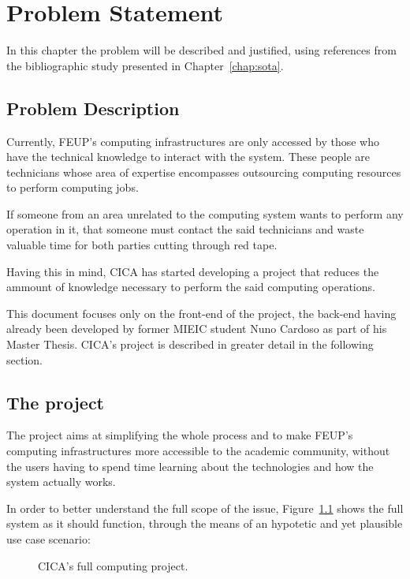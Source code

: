 \chapter{Problem Statement} \label{chap:chap3}

In this chapter the problem will be described and justified, using references from the bibliographic study presented in Chapter~\ref{chap:sota}.

\section{Problem Description}

Currently, FEUP's computing infrastructures are only accessed by those who have the technical knowledge to interact with the system. These people are technicians whose area of expertise encompasses outsourcing computing resources to perform computing jobs. 

If someone from an area unrelated to the computing system wants to perform any operation in it, that someone must contact the said technicians and waste valuable time for both parties cutting through red tape.

Having this in mind, CICA has started developing a project that reduces the ammount of knowledge necessary to perform the said computing operations.

This document focuses only on the front-end of the project, the back-end having already been developed by former MIEIC student Nuno Cardoso as part of his Master Thesis. CICA's project is described in greater detail in the following section.

\section{The project} \label{sec:project}


The project aims at simplifying the whole process and to make FEUP's computing infrastructures more accessible to the academic community, without the users having to spend time learning about the technologies and how the system actually works.

In order to better understand the full scope of the issue, Figure~\ref{fig:big_picture} shows the full system as it should function, through the means of an hypotetic and yet plausible use case scenario:

\begin{figure}[t]
  \begin{center}
    \leavevmode
    \caption{CICA's full computing project.}
    \label{fig:big_picture}
  \end{center}
\end{figure}

